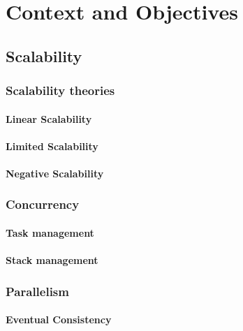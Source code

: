 \chapter{Context and Objectives}


\section{Scalability}
  \subsection{Scalability theories}
    \subsubsection{Linear Scalability}
    \subsubsection{Limited Scalability}
    \subsubsection{Negative Scalability}
  \subsection{Concurrency}
    \subsubsection{Task management}
    \subsubsection{Stack management}
  \subsection{Parallelism}
    \subsubsection{Eventual Consistency}
    \subsubsection{}

% 
% 
